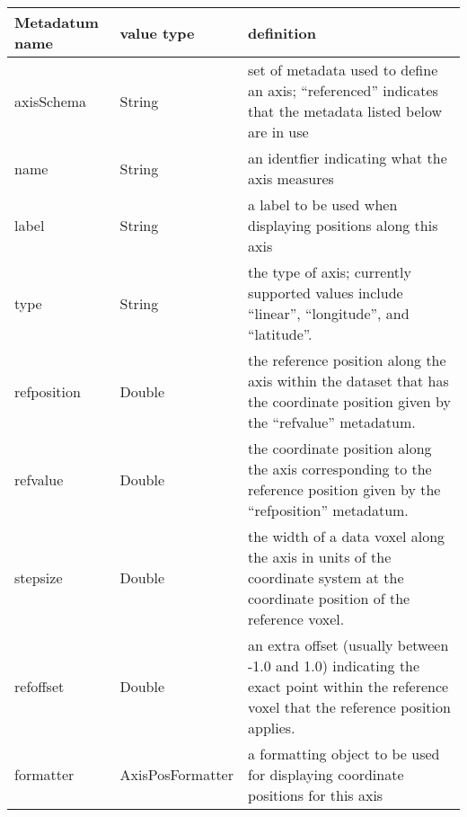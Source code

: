 \documentclass[12pt]{article}
\begin{document}
{\newpage\clearpage\samepage
\begin{table}\label{T:axisMd}

\begin{tabular}{|llp{}|}
\hline
Metadatum name & value type & definition \\  \hline
axisSchema  & String &  set of metadata used to define an axis; 
                        ``referenced'' indicates that the metadata
                        listed below are in use \\ 
	       	    
name        & String &  an identfier indicating what the axis
                        measures \\ 
	       	    
label       & String &  a label to be used when displaying positions
                        along this axis \\ 
	       	    
type        & String &  the type of axis; currently supported values
                        include ``linear'', ``longitude'', and
                        ``latitude''. \\ 
	       	    
refposition & Double &  the reference position along the axis within
                        the dataset that has the coordinate position
                        given by the ``refvalue'' metadatum. \\ 

refvalue    & Double &  the coordinate position along the axis
                        corresponding to the reference position
                        given by the ``refposition'' metadatum. \\ 

stepsize    & Double &  the width of a data voxel along the axis in
                        units of the coordinate system at the coordinate
                        position of the reference voxel. \\ 

refoffset   & Double &  an extra offset (usually between -1.0 and
                        1.0) indicating the exact point within the
                        reference voxel that the reference position
                        applies.  \\ 

formatter   & AxisPosFormatter & a formatting object to be used for
                        displaying coordinate positions for this
                        axis  \\  \hline
\end{tabular}
\end{table}}\hbox{}\vfil
\end{document}
